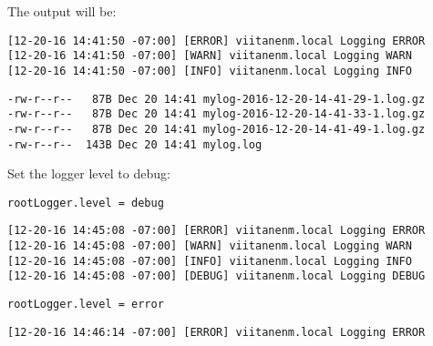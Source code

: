 The output will be:
\begin{lstlisting}
[12-20-16 14:41:50 -07:00] [ERROR] viitanenm.local Logging ERROR
[12-20-16 14:41:50 -07:00] [WARN] viitanenm.local Logging WARN
[12-20-16 14:41:50 -07:00] [INFO] viitanenm.local Logging INFO
\end{lstlisting}

\begin{lstlisting}
-rw-r--r--   87B Dec 20 14:41 mylog-2016-12-20-14-41-29-1.log.gz
-rw-r--r--   87B Dec 20 14:41 mylog-2016-12-20-14-41-33-1.log.gz
-rw-r--r--   87B Dec 20 14:41 mylog-2016-12-20-14-41-49-1.log.gz
-rw-r--r--  143B Dec 20 14:41 mylog.log
\end{lstlisting}

Set the logger level to debug:
\begin{lstlisting}
rootLogger.level = debug
\end{lstlisting}


\begin{lstlisting}
[12-20-16 14:45:08 -07:00] [ERROR] viitanenm.local Logging ERROR
[12-20-16 14:45:08 -07:00] [WARN] viitanenm.local Logging WARN
[12-20-16 14:45:08 -07:00] [INFO] viitanenm.local Logging INFO
[12-20-16 14:45:08 -07:00] [DEBUG] viitanenm.local Logging DEBUG
\end{lstlisting}

\begin{lstlisting}
rootLogger.level = error
\end{lstlisting}

\begin{lstlisting}
[12-20-16 14:46:14 -07:00] [ERROR] viitanenm.local Logging ERROR
\end{lstlisting}